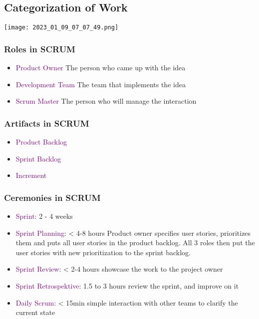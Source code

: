 \documentclass[main.tex,fontsize=12pt,paper=a4,paper=landscape,DIV=calc,]{scrartcl}
\begin{document}
\begin{multicols*}{2}
\subsection{Categorization of Work}
\texttt{[image: 2023\_01\_09\_07\_07\_49.png]}

\subsubsection{Roles in SCRUM}
\begin{itemize}
\item \textcolor{purple}{Product Owner}\newline
  The person who came up with the idea
\item \textcolor{purple}{Development Team}\newline
  The team that implements the idea
\item \textcolor{purple}{Scrum Master}\newline
  The person who will manage the interaction
\end{itemize} 

\subsubsection{Artifacts in SCRUM}
\begin{itemize}
\item \textcolor{purple}{Product Backlog}
\item \textcolor{purple}{Sprint Backlog}
\item \textcolor{purple}{Increment}
\end{itemize} 

\subsubsection{Ceremonies in SCRUM}
\begin{itemize}
\item \textcolor{purple}{Sprint}: 2 - 4 weeks
\item \textcolor{purple}{Sprint Planning}: < 4-8 hours\newline
  Product owner specifies user stories, prioritizes them and puts all user stories in the product backlog.\newline
  All 3 roles then put the user stories with new prioritization to the sprint backlog.\newline
\item \textcolor{purple}{Sprint Review}: < 2-4 hours\newline
  showcase the work to the project owner
\item \textcolor{purple}{Sprint Retrospektive}: 1.5 to 3 hours\newline
  review the sprint, and improve on it
\item \textcolor{purple}{Daily Scrum}: < 15min\newline
  simple interaction with other teams to clarify the current state
\end{itemize} 







\end{multicols*}
\end{document}
